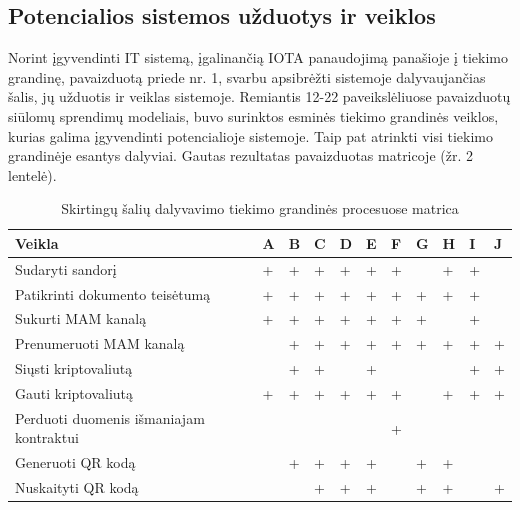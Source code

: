 
\subsection{Potencialios sistemos užduotys ir veiklos}

Norint įgyvendinti IT sistemą, įgalinančią IOTA panaudojimą panašioje į tiekimo grandinę, pavaizduotą priede nr. 1, svarbu apsibrėžti sistemoje dalyvaujančias šalis, jų užduotis ir veiklas sistemoje. Remiantis 12-22 paveikslėliuose pavaizduotų siūlomų sprendimų modeliais, buvo surinktos esminės tiekimo grandinės veiklos, kurias galima įgyvendinti potencialioje sistemoje. Taip pat atrinkti visi tiekimo grandinėje esantys dalyviai. Gautas rezultatas pavaizduotas matricoje (žr. 2 lentelė). 

\begin{table}[h]
\centering
\caption{Skirtingų šalių dalyvavimo tiekimo grandinės procesuose matrica}
\begin{tabular}{|l|l|l|l|l|l|l|l|l|l|l|}
\hline
\textbf{Veikla} & \multicolumn{1}{c|}{\textbf{A}} & \multicolumn{1}{c|}{\textbf{B}} & \textbf{C} & \textbf{D} & \textbf{E} & \textbf{F} & \textbf{G} & \textbf{H} & \textbf{I} & \textbf{J} \\ \hline
Sudaryti sandorį & + & + & + & + & + & + &  & + & + &  \\ \hline
Patikrinti dokumento teisėtumą & + & + & + & + & + & + & + & + & + &  \\ \hline
Sukurti MAM kanalą & + & + & + & + & + & + & + &  & + &  \\ \hline
Prenumeruoti MAM kanalą &  & + & + & + & + & + & + & + & + & + \\ \hline
Siųsti kriptovaliutą &  & + & + &  & + &  &  &  & + & + \\ \hline
Gauti kriptovaliutą & + & + & + & + & + & + &  & + & + & + \\ \hline
Perduoti duomenis išmaniajam kontraktui &  &  &  &  &  & + &  &  &  &  \\ \hline
Generuoti QR kodą &  & + & + & + & + &  & + & + &  &  \\ \hline
Nuskaityti QR kodą &  &  & + & + & + &  & + & + &  & + \\ \hline
\end{tabular}
\end{table}

